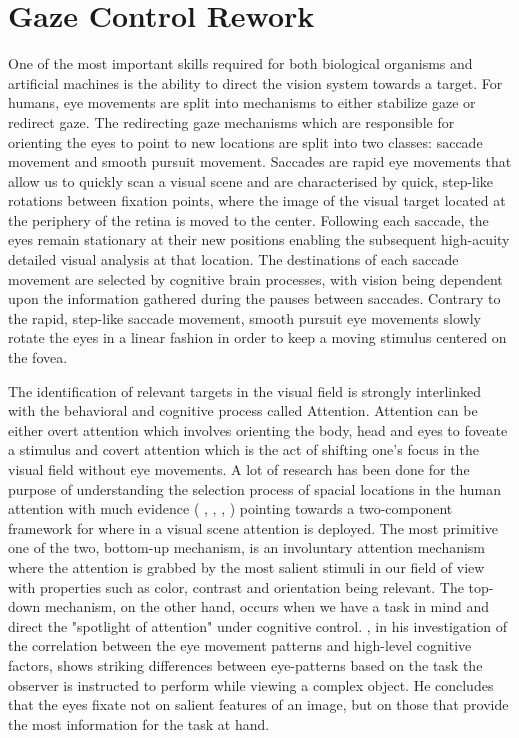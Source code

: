 \documentclass{l4proj}
\begin{document}
\section{Gaze Control Rework}

One of the most important skills required for both biological organisms and artificial machines is the ability to direct the vision system towards a target. For humans, eye movements are split into mechanisms to either stabilize gaze or redirect gaze. The redirecting gaze mechanisms which are responsible for orienting the eyes to point to new locations are split into two classes: saccade movement and smooth pursuit movement. Saccades are rapid eye movements that allow us to quickly scan a visual scene and are characterised by quick, step-like rotations between fixation points, where the image of the visual target located at the periphery of the retina is moved to the center. Following each saccade, the eyes remain stationary at their new positions enabling the subsequent high-acuity detailed visual analysis at that location. The destinations of each saccade movement are selected by cognitive brain processes, with vision being dependent upon the information gathered during the pauses between saccades. Contrary to the rapid, step-like saccade movement, smooth pursuit eye movements slowly rotate the eyes in a linear fashion in order to keep a moving stimulus centered on the fovea.


The identification of relevant targets in the visual field is strongly interlinked with the behavioral and cognitive process called Attention. Attention can be either overt attention which involves orienting the body, head and eyes to foveate a stimulus and covert attention which is the act of shifting one's focus in the visual field without eye movements. A lot of research has been done for the purpose of understanding the selection process of spacial locations in the human attention with much evidence ( \citet{James1890}, \citet{Treissman1988}, \citet{Braun1998}, \citet{Itti2000} ) pointing towards a two-component framework for where in a visual scene attention is deployed. The most primitive one of the two, bottom-up mechanism, is an involuntary attention mechanism where the attention is grabbed by the most salient stimuli in our field of view with properties such as color, contrast and orientation being relevant. The top-down mechanism, on the other hand, occurs when we have a task in mind and direct the "spotlight of attention" under cognitive control. \citet{yarbus1967eye}, in his investigation of the correlation between the eye movement patterns and high-level cognitive factors, shows striking differences between eye-patterns based on the task the observer is instructed to perform while viewing a complex object. He concludes that the eyes fixate not on salient features of an image, but on those that provide the most information for the task at hand. 
\end{document}
